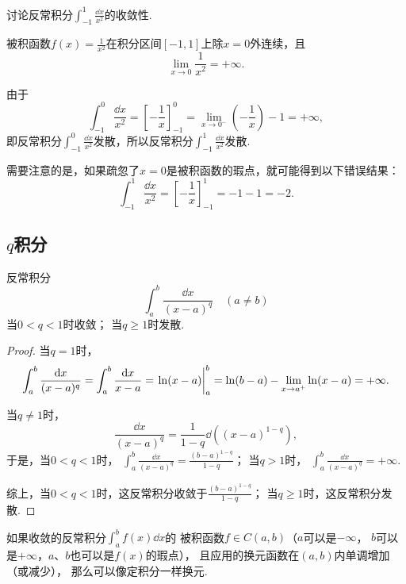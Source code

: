 \begin{example}
讨论反常积分\(\int_{-1}^1 \frac{\dd{x}}{x^2}\)的收敛性.
\begin{solution}
被积函数\(f(x) = \frac{1}{x^2}\)在积分区间\([-1,1]\)上除\(x=0\)外连续，且\[
\lim_{x\to0} \frac{1}{x^2} = +\infty.
\]

由于\[
\int_{-1}^0 \frac{\dd{x}}{x^2}
= \left[-\frac{1}{x}\right]_{-1}^0
= \lim_{x\to0^-} \left(-\frac{1}{x}\right) - 1
= +\infty,
\]即反常积分\(\int_{-1}^0 \frac{\dd{x}}{x^2}\)发散，所以反常积分\(\int_{-1}^1 \frac{\dd{x}}{x^2}\)发散.
\end{solution}

需要注意的是，如果疏忽了\(x=0\)是被积函数的瑕点，就可能得到以下错误结果：\[
\int_{-1}^1 \frac{\dd{x}}{x^2}
= \left[ -\frac{1}{x} \right]_{-1}^1
= -1 - 1 = -2.
\]
\end{example}

\subsection{\texorpdfstring{\(q\)}{q}积分}
\begin{proposition}[\(q\)积分]\label{example:定积分.q积分}
反常积分\[
	\int_a^b \frac{\dd{x}}{(x-a)^q}
	\quad(a \neq b)
\]
当\(0 < q < 1\)时收敛；
当\(q \geq 1\)时发散.
\begin{proof}
当\(q=1\)时，\[
	\int_a^b \frac{\dd{x}}{(x-a)^q}
	= \int_a^b \frac{\dd{x}}{x-a}
	= \eval{\ln(x-a)}_a^b
	= \ln(b-a) - \lim_{x \to a^+} \ln(x-a)
	= +\infty.
\]

当\(q\neq1\)时，\[
	\frac{\dd{x}}{(x-a)^q}
	= \frac{1}{1-q} \dd((x-a)^{1-q}),
\]
于是，当\(0<q<1\)时，
\(\int_a^b \frac{\dd{x}}{(x-a)^q}
= \frac{(b-a)^{1-q}}{1-q}\)；
当\(q>1\)时，
\(\int_a^b \frac{\dd{x}}{(x-a)^q}
= +\infty\).

综上，当\(0<q<1\)时，这反常积分收敛于\(\frac{(b-a)^{1-q}}{1-q}\)；
当\(q\geq1\)时，这反常积分发散.
\end{proof}
\end{proposition}

如果收敛的反常积分\(\int_a^b f(x) \dd{x}\)的%
被积函数\(f \in C(a,b)\)（\(a\)可以是\(-\infty\)，
\(b\)可以是\(+\infty\)，\(a\)、\(b\)也可以是\(f(x)\)的瑕点），
且应用的换元函数在\((a,b)\)内单调增加（或减少），
那么可以像定积分一样换元.

